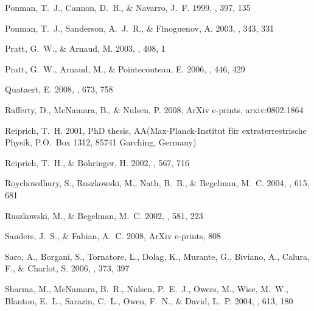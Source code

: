 \documentclass[12pt,preprint]{aastex}
\begin{document}
\begin{thebibliography}{139}
{Ponman}, T.~J., {Cannon}, D.~B., \& {Navarro}, J.~F. 1999, \nat, 397, 135

{Ponman}, T.~J., {Sanderson}, A.~J.~R., \& {Finoguenov}, A. 2003, \mnras, 343,
  331

{Pratt}, G.~W., \& {Arnaud}, M. 2003, \aap, 408, 1

{Pratt}, G.~W., {Arnaud}, M., \& {Pointecouteau}, E. 2006, \aap, 446, 429

{Quataert}, E. 2008, \apj, 673, 758

{Rafferty}, D., {McNamara}, B., \& {Nulsen}, P. 2008, ArXiv e-prints,
  arxiv:0802.1864

{Reiprich}, T.~H. 2001, PhD thesis, AA(Max-Planck-Institut f{\"u}r
  extraterrestrische Physik, P.O.~Box 1312, 85741 Garching, Germany)

{Reiprich}, T.~H., \& {B{\"o}hringer}, H. 2002, \apj, 567, 716

{Roychowdhury}, S., {Ruszkowski}, M., {Nath}, B.~B., \& {Begelman}, M.~C. 2004,
  \apj, 615, 681

{Ruszkowski}, M., \& {Begelman}, M.~C. 2002, \apj, 581, 223

{Sanders}, J.~S., \& {Fabian}, A.~C. 2008, ArXiv e-prints, 808

{Saro}, A., {Borgani}, S., {Tornatore}, L., {Dolag}, K., {Murante}, G.,
  {Biviano}, A., {Calura}, F., \& {Charlot}, S. 2006, \mnras, 373, 397

{Sharma}, M., {McNamara}, B.~R., {Nulsen}, P.~E.~J., {Owers}, M., {Wise},
  M.~W., {Blanton}, E.~L., {Sarazin}, C.~L., {Owen}, F.~N., \& {David}, L.~P.
  2004, \apj, 613, 180


\end{thebibliography}
\end{document}
